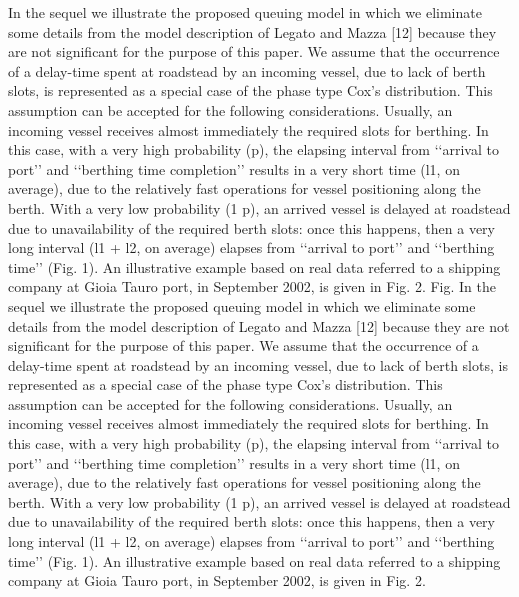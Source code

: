 In the sequel we illustrate the proposed queuing model in which we eliminate some details from the model description of Legato and Mazza [12] because they are not significant for the purpose of this paper.
We assume that the occurrence of a delay-time spent at roadstead by an incoming vessel, due to lack of berth slots, is represented as a special case of the phase type Cox’s distribution. This assumption can be accepted for the following considerations. Usually, an incoming vessel receives almost immediately the required slots for berthing. In this case, with a very high probability (p), the elapsing interval from ‘‘arrival to port’’ and ‘‘berthing time completion’’ results in a very short time (l1, on average), due to the relatively fast operations for vessel positioning along the berth. With a very low probability (1  p), an arrived vessel is delayed at roadstead due to unavailability of the required berth slots: once this happens, then a very long interval (l1 + l2, on average) elapses from ‘‘arrival to port’’ and ‘‘berthing time’’ (Fig. 1). An illustrative example based on real data referred to a shipping company at Gioia Tauro port, in September 2002, is given in Fig. 2. Fig.
In the sequel we illustrate the proposed queuing model in which we eliminate some details from the model
description of Legato and Mazza [12] because they are not significant for the purpose of this paper.
We assume that the occurrence of a delay-time spent at roadstead by an incoming vessel, due to lack of
berth slots, is represented as a special case of the phase type Cox’s distribution. This assumption can be
accepted for the following considerations. Usually, an incoming vessel receives almost immediately the
required slots for berthing. In this case, with a very high probability (p), the elapsing interval from ‘‘arrival
to port’’ and ‘‘berthing time completion’’ results in a very short time (l1, on average), due to the relatively
fast operations for vessel positioning along the berth. With a very low probability (1  p), an arrived vessel
is delayed at roadstead due to unavailability of the required berth slots: once this happens, then a very long
interval (l1 + l2, on average) elapses from ‘‘arrival to port’’ and ‘‘berthing time’’ (Fig. 1). An illustrative
example based on real data referred to a shipping company at Gioia Tauro port, in September 2002, is given
in Fig. 2.


